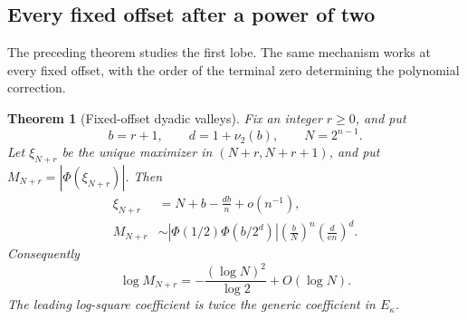 \documentclass[11pt,oneside]{article}
\numberwithin{equation}{section}
\newtheorem{theorem}{Theorem}[section]
\theoremstyle{definition}
\theoremstyle{remark}
\newcommand{\e}{\mathrm e}
\newcommand{\abs}[1]{\left|#1\right|}
\newcommand{\PhiUp}{\Phi}
\newcommand{\nuTwo}{\nu_2}
\begin{document}
\subsection{Every fixed offset after a power of two}

The preceding theorem studies the first lobe.  The same mechanism works at every fixed
offset, with the order of the terminal zero determining the polynomial correction.

\begin{theorem}[Fixed-offset dyadic valleys]
\label{thm:dyadic-valleys}
Fix an integer \(r\ge0\), and put
\begin{equation}
 b=r+1,
 \qquad d=1+\nuTwo(b),
 \qquad N=2^{n-1}.
 \label{eq:valley-parameters}
\end{equation}
Let \(\xi_{N+r}\) be the unique maximizer in \((N+r,N+r+1)\), and put
\(M_{N+r}=\abs{\PhiUp(\xi_{N+r})}\).  Then
\begin{align}
 \xi_{N+r}
 &=N+b-\frac{db}{n}+o(n^{-1}),
 \label{eq:valley-location}\\
 M_{N+r}
 &\sim
 \abs{\PhiUp(1/2)\PhiUp(b/2^d)}
 \left(\frac bN\right)^n
 \left(\frac d{\e n}\right)^d.
 \label{eq:valley-amplitude}
\end{align}
Consequently
\begin{equation}
 \log M_{N+r}
 =-\frac{(\log N)^2}{\log2}+O(\log N).
 \label{eq:valley-log-rate}
\end{equation}
The leading log-square coefficient is twice the generic coefficient in \(E_\kappa\).
\end{theorem}
\end{document}
